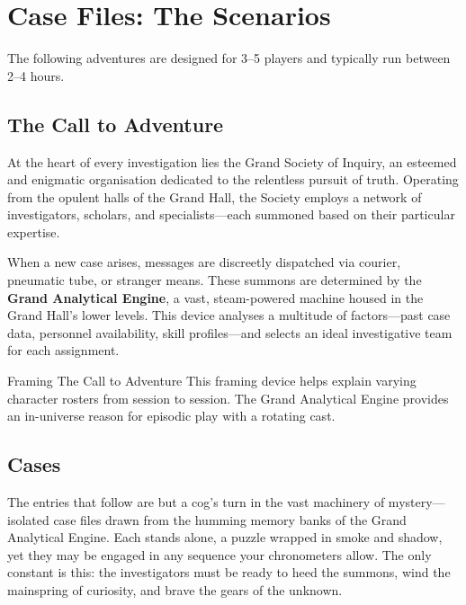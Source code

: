 \newpage
\section[Case Files: The Scenarios]{Case Files: The Scenarios}

The following adventures are designed for 3–5 players and typically run between 2–4 hours.

\begin{multicols}{2}

\subsection{The Call to Adventure}

At the heart of every investigation lies the Grand Society of Inquiry, an esteemed and enigmatic organisation dedicated to the relentless pursuit of truth. Operating from the opulent halls of the Grand Hall, the Society employs a network of investigators, scholars, and specialists—each summoned based on their particular expertise.

When a new case arises, messages are discreetly dispatched via courier, pneumatic tube, or stranger means. These summons are determined by the \textbf{Grand Analytical Engine}, a vast, steam-powered machine housed in the Grand Hall’s lower levels. This device analyses a multitude of factors—past case data, personnel availability, skill profiles—and selects an ideal investigative team for each assignment.

\begin{CommentBox}{Framing The Call to Adventure}
    This framing device helps explain varying character rosters from session to session. The Grand Analytical Engine provides an in-universe reason for episodic play with a rotating cast.
\end{CommentBox}
\end{multicols}

\subsection{Cases}

The entries that follow are but a cog’s turn in the vast machinery of mystery—isolated case files drawn from the humming memory banks of the Grand Analytical Engine. Each stands alone, a puzzle wrapped in smoke and shadow, yet they may be engaged in any sequence your chronometers allow. The only constant is this: the investigators must be ready to heed the summons, wind the mainspring of curiosity, and brave the gears of the unknown.


